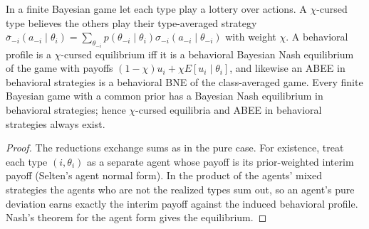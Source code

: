 \begin{theorem}
\label{thm:beh-cursed-mixed}
\leanok
In a finite Bayesian game let each type play a lottery over actions. A $\chi$-cursed type believes the others play
their type-averaged strategy $\bar\sigma_{-i}(a_{-i}\mid\theta_i)=\sum_{\theta_{-i}}p(\theta_{-i}\mid\theta_i)\sigma_{-i}(a_{-i}\mid\theta_{-i})$
with weight $\chi$. A behavioral profile is a $\chi$-cursed equilibrium iff it is a behavioral Bayesian Nash
equilibrium of the game with payoffs $(1-\chi)u_i+\chi E[u_i\mid\theta_i]$, and likewise an ABEE in behavioral
strategies is a behavioral BNE of the class-averaged game. Every finite Bayesian game with a common prior has a
Bayesian Nash equilibrium in behavioral strategies; hence $\chi$-cursed equilibria and ABEE in behavioral strategies
always exist.
\end{theorem}
\begin{proof}
\leanok
The reductions exchange sums as in the pure case. For existence, treat each type $(i,\theta_i)$ as a separate agent
whose payoff is its prior-weighted interim payoff (Selten's agent normal form). In the product of the agents' mixed
strategies the agents who are not the realized types sum out, so an agent's pure deviation earns exactly the interim
payoff against the induced behavioral profile. Nash's theorem for the agent form gives the equilibrium.
\end{proof}

